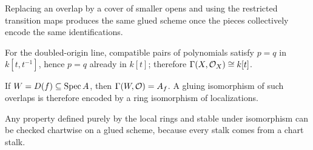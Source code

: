 \begin{example}
Replacing an overlap by a cover of smaller opens and using the restricted transition maps produces the same glued scheme once the pieces collectively encode the same identifications.
\end{example}

\begin{example}
For the doubled-origin line, compatible pairs of polynomials satisfy $p=q$ in $k[t,t^{-1}]$, hence $p=q$ already in $k[t]$; therefore $\Gamma(X,\mathcal O_X)\cong k[t]$.
\end{example}

\begin{example}
If $W=D(f)\subseteq\operatorname{Spec} A$, then $\Gamma(W,\mathcal O)=A_f$.  A gluing isomorphism of such overlaps is therefore encoded by a ring isomorphism of localizations.
\end{example}

\begin{example}
Any property defined purely by the local rings and stable under isomorphism can be checked chartwise on a glued scheme, because every stalk comes from a chart stalk.
\end{example}

